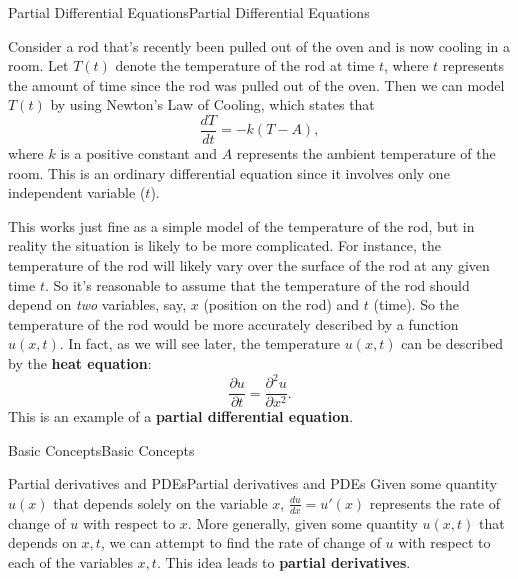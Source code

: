 \documentclass[10pt,]{book}
\newcommand{\terminology}[1]{\textbf{#1}}
\numberwithin{equation}{section}
\begin{document}
\begin{chapterptx}{Partial Differential Equations}{}{Partial Differential Equations}{}{}\label{partial-differential-equations}
\begin{introduction}{}%
\hypertarget{p-433}{}%
Consider a rod that's recently been pulled out of the oven and is now cooling in a room. Let \(T(t)\) denote the temperature of the rod at time \(t\), where \(t\) represents the amount of time since the rod was pulled out of the oven. Then we can model \(T(t)\) by using Newton's Law of Cooling, which states that%
\begin{equation*}
\frac{dT}{dt} = -k(T-A),
\end{equation*}
where \(k\) is a positive constant and \(A\) represents the ambient temperature of the room. This is an ordinary differential equation since it involves only one independent variable (\(t\)).%
\par
\hypertarget{p-434}{}%
This works just fine as a simple model of the temperature of the rod, but in reality the situation is likely to be more complicated. For instance, the temperature of the rod will likely vary over the surface of the rod at any given time \(t\). So it's reasonable to assume that the temperature of the rod should depend on \emph{two} variables, say, \(x\) (position on the rod) and \(t\) (time). So the temperature of the rod would be more accurately described by a function \(u(x,t)\). In fact, as we will see later, the temperature \(u(x,t)\) can be described by the \terminology{heat equation}:%
%
\begin{equation*}
\frac{\partial u}{\partial t} = \frac{\partial^{2}u}{\partial x^{2}}.
\end{equation*}
\hypertarget{p-435}{}%
This is an example of a \terminology{partial differential equation}.%
\end{introduction}%
%
%
\typeout{************************************************}
\typeout{************************************************}
%
\begin{sectionptx}{Basic Concepts}{}{Basic Concepts}{}{}\label{section-basic-concepts}
%
%
\typeout{************************************************}
\typeout{************************************************}
%
\begin{subsectionptx}{Partial derivatives and PDEs}{}{Partial derivatives and PDEs}{}{}\label{subsection-partial-derivatives-and-pdes}
\hypertarget{p-436}{}%
Given some quantity \(u(x)\) that depends solely on the variable \(x\), \(\frac{du}{dx} = u'(x)\) represents the rate of change of \(u\) with respect to \(x\). More generally, given some quantity \(u(x,t)\) that depends on \(x,t\), we can attempt to find the rate of change of \(u\) with respect to each of the variables \(x,t\). This idea leads to \terminology{partial derivatives}.%

\end{subsectionptx}
\end{sectionptx}
\end{chapterptx}
\end{document}
